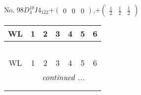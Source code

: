 \documentclass[fleqn,9pt,landscape]{jsarticle}
\begin{document}
\newpage
No. 98\quad$D_{4}^{10}$\quad$I4_122$\quad[ tetragonal ]\quad$+\begin{pmatrix} 0 & 0 & 0 \end{pmatrix}$,\quad $+\begin{pmatrix} \frac{1}{2} & \frac{1}{2} & \frac{1}{2} \end{pmatrix}$
\begin{center}
\renewcommand{\arraystretch}{1.2}
\begin{longtable}{ccccccc}
 \hline \hline
WL & 1 & 2 & 3 & 4 & 5 & 6 \\ \hline \endfirsthead

\multicolumn{6}{l}{\tablename\ \thetable{}} \\
 \hline \hline
WL & 1 & 2 & 3 & 4 & 5 & 6 \\ \hline \endhead

 \hline \hline
\multicolumn{6}{r}{\footnotesize\it continued ...} \\ \endfoot

 \hline \hline
\multicolumn{6}{r}{} \\ \endlastfoot


\end{longtable}
\end{center}
\end{document}
